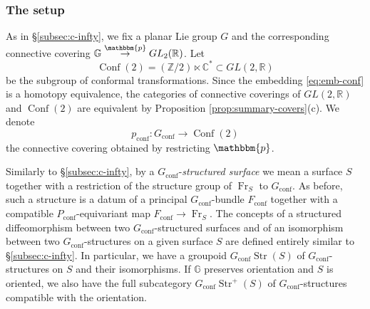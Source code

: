 \documentclass[english,11pt,leqno]{article}
\def\CC{\mathbb{C}}
\def\GG{\mathbb{G}}
\def\RR{\mathbb{R}}
\def\ZZ{\mathbb{Z}}
\def\conf{{\on{conf}}}
\def\Conf{{\on{Conf}}}
\def\on{\operatorname}
\def\lra{\longrightarrow}
\def\Fr{\on{Fr}}
\def\Gcstr{G_\conf\on{Str}}
\def\p{\mathbbm{p}}
\theoremstyle{definition}
\theoremstyle{remark}
\numberwithin{equation}{section}
\begin{document}
\subsubsection {The setup}
As in \S \ref{subsec:c-infty}, we fix a planar Lie group $G$ and the corresponding connective covering
$\GG\buildrel\p\over\to GL_2(\RR)$. Let
\begin{equation}
	\label{eq:emb-conf}
	\Conf(2) = (\ZZ/2)\ltimes \CC^* \subset GL(2, \RR)
\end{equation}
be the subgroup of conformal transformations. Since the embedding \eqref{eq:emb-conf}
is a homotopy equivalence, the categories of connective coverings of $GL(2,\RR)$ and $\Conf(2)$
are equivalent by Proposition \ref {prop:summary-covers}(c). We denote
\[
p_\conf: G_\conf\lra \Conf(2)
\]
the connective covering obtained by restricting $\p$. 

Similarly to  \S \ref{subsec:c-infty}, by a
$G_\conf$-{\em structured surface} we mean a surface $S$ together with a restriction of the structure
group of $\Fr_S$ to $G_\conf$. As before, such a structure is a datum of a principal $G_\conf$-bundle
$F_\conf$ together with a compatible $P_\conf$-equivariant map $F_\conf\to\Fr_S$. 
The concepts of a structured diffeomorphism between two $G_\conf$-structured surfaces and of an isomorphism
between two $G_\conf$-structures on a given surface $S$ are defined entirely similar to 
\S \ref{subsec:c-infty}. In particular, we have a groupoid $\Gcstr(S)$ of $G_\conf$-structures on $S$
and their isomorphisms. If $\GG$ preserves orientation and $S$ is oriented, we also have the full
subcategory $\Gcstr^+(S)$ of $G_\conf$-structures compatible with the orientation. 
\end{document}
